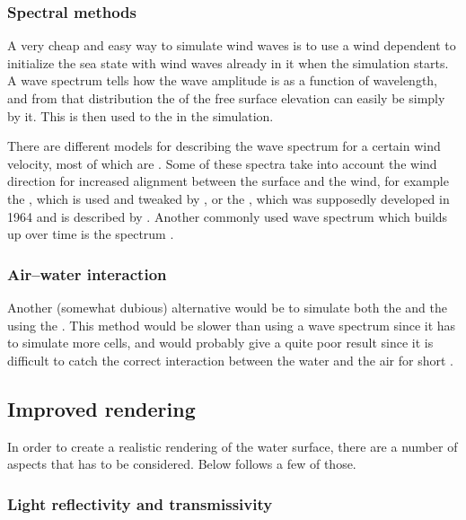 \subsubsection{Spectral methods}

A very cheap and easy way to simulate wind waves is to use a wind dependent  to initialize the sea state with wind waves already in it when the simulation starts. A wave spectrum tells how the wave amplitude is \distributed as a function of wavelength, and from that distribution the  of the free surface elevation can easily be \generated simply by \sampling it. This is then used to \initialize the  in the simulation.

There are different models for describing the wave spectrum for a certain wind velocity, most of which are \empirical. Some of these spectra take into account the wind direction for increased alignment between the surface and the wind, for example the , which is used and tweaked by \citet{Tessendorf2001}, or the , which was supposedly developed in 1964 and is described by \citet{Premovze2001}. Another commonly used wave spectrum which builds up over time is the \JONSWAP spectrum \citep{Journee2001b,WikiWaves2013}.

\subsubsection{Air--water interaction}

Another (somewhat dubious) alternative would be to simulate both the \water and the \air using the \FVM. This method would be slower than using a wave spectrum since it has to simulate more cells, and would probably give a quite poor result since it is difficult to catch the correct interaction between the water and the air for short \wavelengths.

\subsection{Improved rendering}

In order to create a realistic rendering of the water surface, there are a number of aspects that has to be considered. Below follows a few of those.

\subsubsection{Light reflectivity and transmissivity}

